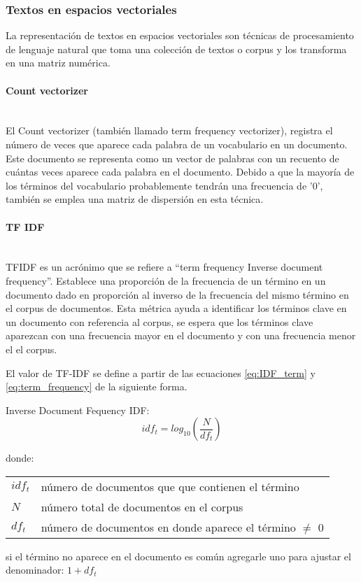 \documentclass[12pt]{article}
\makeatletter
\newcommand{\subsubsubsection}[1]{\paragraph{#1}\mbox{}\\}
\newenvironment{conditions}
{\par\vspace{\abovedisplayskip}\noindent\begin{tabular}{>{$}l<{$} @{${}={}$} l}}
	{\end{tabular}\par\vspace{\belowdisplayskip}}
\makeatother
\begin{document}
			
			\subsubsection{Textos en espacios vectoriales}
			La representación de textos en espacios vectoriales son técnicas de procesamiento de lenguaje natural que toma una colección de textos o corpus y los transforma en una matriz numérica. \cite{Shahmirzadi2018}
				
				\subsubsubsection{Count vectorizer}
				El Count vectorizer (también llamado term frequency vectorizer), registra el número de veces que aparece cada palabra de un vocabulario en un documento. Este documento se representa como un vector de palabras con un recuento de cuántas veces aparece cada palabra en el documento. Debido a que la mayoría de los términos del vocabulario probablemente tendrán una frecuencia de '0', también se emplea una matriz de dispersión en esta técnica. \cite{Basarkar2017}
				
				\subsubsubsection{TF IDF}
				TFIDF es un acrónimo que se refiere a ``term frequency Inverse document frequency''. 
				Establece una proporción de la frecuencia de un término en un documento dado en proporción al inverso de la frecuencia del mismo término en el corpus de documentos.
				Esta métrica ayuda a identificar los términos clave en un documento con referencia al corpus, se espera que los términos clave aparezcan con una frecuencia mayor en el documento y con una frecuencia menor el el corpus. \cite{Siregar2019}
				
				El valor de TF-IDF se define a partir de las ecuaciones \ref{eq:IDF_term} y \ref{eq:term_frequency} de la siguiente forma.
								
				Inverse Document Fequency IDF:
				\begin{equation}\label{eq:IDF_term}
					idf_t = log_{10}(\frac{N}{df_t}) 
				\end{equation}
				
				donde:
				\begin{conditions}
					idf_t &  número de documentos que que contienen el término \\
					N     &  número total de documentos en el corpus \\   
					df_t  &  número de documentos en donde aparece el término $\neq$ 0
				\end{conditions}
				 si el término no aparece en el documento es común agregarle uno para ajustar el denominador: $1 + df_t $
				
\end{document}
